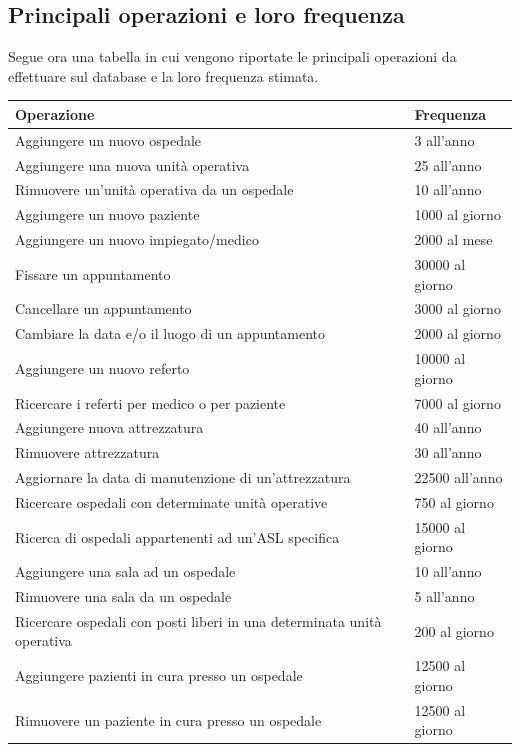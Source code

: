\documentclass[a4paper,12pt]{report}
\begin{document}
\subsection{Principali operazioni e loro frequenza}
Segue ora una tabella in cui vengono riportate le principali operazioni da effettuare sul database e la loro frequenza stimata.
\begin{center}
  \begin{tabular}{ p{269pt} | l }
    Operazione & Frequenza \\
    \hline
    \hline
    Aggiungere un nuovo ospedale & 3 all'anno \\
    Aggiungere una nuova unità operativa & 25 all'anno \\
    Rimuovere un'unità operativa da un ospedale & 10 all'anno \\
    Aggiungere un nuovo paziente & 1000 al giorno \\
    Aggiungere un nuovo impiegato/medico & 2000 al mese \\
    Fissare un appuntamento & 30000 al giorno \\
    Cancellare un appuntamento & 3000 al giorno \\
    Cambiare la data e/o il luogo di un appuntamento & 2000 al giorno \\
    Aggiungere un nuovo referto & 10000 al giorno \\
    Ricercare i referti per medico o per paziente & 7000 al giorno \\
    Aggiungere nuova attrezzatura & 40 all'anno \\
    Rimuovere attrezzatura & 30 all'anno \\
    Aggiornare la data di manutenzione di un'attrezzatura & 22500 all'anno \\
    Ricercare ospedali con determinate unità operative & 750 al giorno \\
    Ricerca di ospedali appartenenti ad un'ASL specifica & 15000 al giorno \\
    Aggiungere una sala ad un ospedale & 10 all'anno \\
    Rimuovere una sala da un ospedale & 5 all'anno \\
    Ricercare ospedali con posti liberi in una determinata unità operativa & 200 al giorno \\
    Aggiungere pazienti in cura presso un ospedale & 12500 al giorno \\
    Rimuovere un paziente in cura presso un ospedale & 12500 al giorno \\
  \end{tabular}
\end{center}
\end{document}
